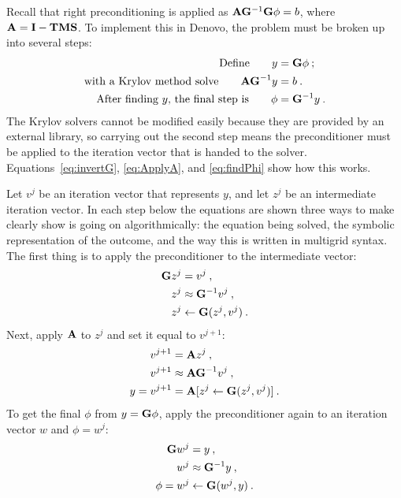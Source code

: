 Recall that right preconditioning is applied as $\mathbf{A} \mathbf{G}^{-1} \mathbf{G} \phi = b$, where $\mathbf{A} = \mathbf{I} - \mathbf{TMS}$. To implement this in Denovo, the problem must be broken up into several steps: 
%
\begin{align}
  \text{Define} \qquad y &= \mathbf{G}\phi \:;\\
  \text{with a Krylov method solve} \qquad \mathbf{AG}^{-1}y &= b \:. \\
  \text{After finding }y\text{, the final step is} \qquad \phi &= \mathbf{G}^{-1}y \:.
\end{align}
%
The Krylov solvers cannot be modified easily because they are provided by an external library, so carrying out the second step means the preconditioner must be applied to the iteration vector that is handed to the solver. Equations~\eqref{eq:invertG}, \eqref{eq:ApplyA}, and \eqref{eq:findPhi} show how this works.  

Let $v^{j}$ be an iteration vector that represents $y$, and let $z^{j}$ be an intermediate iteration vector. In each step below the equations are shown three ways to make clearly show is going on algorithmically: the equation being solved, the symbolic representation of the outcome, and the way this is written in multigrid syntax. The first thing is to apply the preconditioner to the intermediate vector: %
%
\begin{align}
  \mathbf{G}z^{j} &= v^{j} \:,  \label{eq:invertG} \\
  z^{j} &\approx \mathbf{G}^{-1}v^{j} \:, \nonumber \\
  z^{j} &\leftarrow \mathbf{G}(z^{j}, v^{j}) \:. \nonumber
\end{align}
%
Next, apply $\mathbf{A}$ to $z^{j}$ and set it equal to $v^{j+1}$:
\begin{align}
  v^{j+1} &= \mathbf{A}z^{j} \:,   \label{eq:ApplyA} \\
  v^{j+1} &\approx \mathbf{AG}^{-1}v^{j} \:, \nonumber \\
  y = v^{j+1} &= \mathbf{A}[z^{j} \leftarrow \mathbf{G}(z^{j}, v^{j})] \:. \nonumber
\end{align}
%
To get the final $\phi$ from $y = \mathbf{G}\phi$, apply the preconditioner again to an iteration vector $w$ and $\phi = w^{j}$:
%
\begin{align}
  \mathbf{G}w^{j} &= y \:,   \label{eq:findPhi} \\
  w^{j} &\approx \mathbf{G}^{-1}y \:, \nonumber \\
  \phi = w^{j} &\leftarrow \mathbf{G}(w^{j}, y) \:. \nonumber
\end{align}

